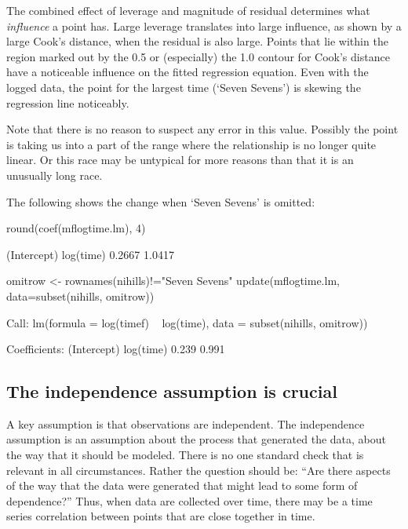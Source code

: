 \documentclass{tufte-book}\usepackage[]{graphicx}\usepackage[]{color}
\begin{document}
The combined
effect of leverage and magnitude of residual determines
what {\em influence} a point has.  Large leverage translates into
large influence, as shown by a large Cook's distance, when the
residual is also large.  Points that lie within the region marked out
by the 0.5 or (especially) the 1.0 contour for Cook's distance have a
noticeable influence on the fitted regression equation.  Even with the
logged data, the point for the largest time (`Seven Sevens') is
skewing the regression line noticeably.

Note that there is no reason to suspect any error in this value.  Possibly
the point is taking us into a part of the range where the relationship
is no longer quite linear.  Or this race may be untypical for more
reasons than that it is an unusually long race.

The following shows the change when `Seven Sevens' is omitted:
\begin{Schunk}
\begin{Sinput}
round(coef(mflogtime.lm), 4)
\end{Sinput}
\begin{Soutput}
(Intercept)   log(time) 
     0.2667      1.0417 
\end{Soutput}
\begin{Sinput}
omitrow <- rownames(nihills)!="Seven Sevens"
update(mflogtime.lm, data=subset(nihills, omitrow))
\end{Sinput}
\begin{Soutput}

Call:
lm(formula = log(timef) ~ log(time), data = subset(nihills, omitrow))

Coefficients:
(Intercept)    log(time)  
      0.239        0.991  
\end{Soutput}
\end{Schunk}

 \subsection{The independence assumption is crucial}

 A key assumption is that observations are independent.  The
 independence assumption is an assumption about the process that
 generated the data, about the way that it should be modeled.
 There is no one standard check that is relevant in all circumstances.
 Rather the question should be: ``Are there aspects of the way that
 the data were generated that might lead to some form of dependence?''
 Thus, when data are collected over time, there may be a time series
 correlation between points that are close together in time.
\end{document}
